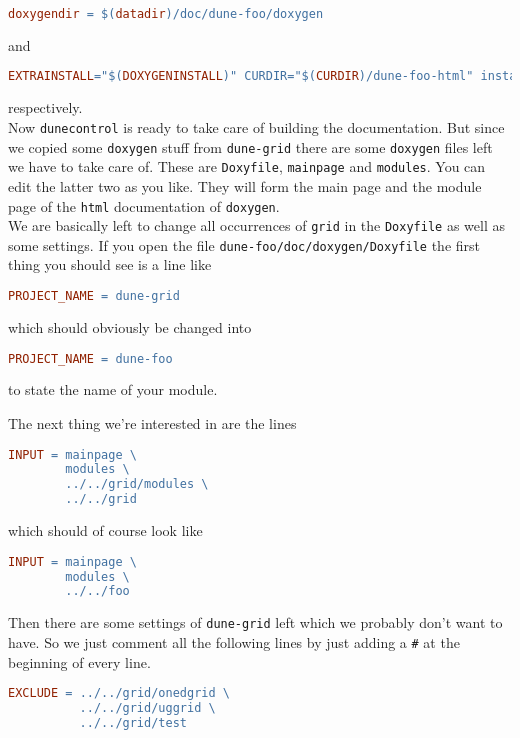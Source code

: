 \documentclass[11pt,a4paper,headinclude,footinclude,DIV16,normalheadings]{scrartcl}
\newcommand{\dunegrid}{\texttt{dune-grid}\xspace}
\newcommand{\dunecontrol}{\texttt{dunecontrol}\xspace}
\begin{document}
\begin{lstlisting}[language=make]
doxygendir = $(datadir)/doc/dune-foo/doxygen
\end{lstlisting}
and

\begin{lstlisting}[language=make]
EXTRAINSTALL="$(DOXYGENINSTALL)" CURDIR="$(CURDIR)/dune-foo-html" install ; \
\end{lstlisting}
respectively.\\
Now \dunecontrol is ready to take care of building the documentation. But since
we copied some \texttt{doxygen} stuff from \dunegrid there are some
\texttt{doxygen} files left we have to take care of. These are
\texttt{Doxyfile}, \texttt{mainpage} and \texttt{modules}. You can edit the
latter two as you like. They will form the main page and the module page of the
\texttt{html} documentation of \texttt{doxygen}.\\
We are basically left to change all occurrences of \texttt{grid} in the
\texttt{Doxyfile} as well as some settings. If you open the file 
\texttt{dune-foo/doc/doxygen/Doxyfile} the first thing you should see is a line
like

\begin{lstlisting}[language=make]
PROJECT_NAME = dune-grid
\end{lstlisting}
which should obviously be changed into

\begin{lstlisting}[language=make]
PROJECT_NAME = dune-foo
\end{lstlisting}
to state the name of your module.

The next thing we're interested in are the lines

\begin{lstlisting}[language=make]
INPUT = mainpage \
        modules \
        ../../grid/modules \
        ../../grid
\end{lstlisting}
which should of course look like

\begin{lstlisting}[language=make]
INPUT = mainpage \
        modules \
        ../../foo
\end{lstlisting}

Then there are some settings of \dunegrid left which we probably don't want to
have. So we just comment all the following lines by just adding a \texttt{\#}
at the beginning of every line.

\begin{lstlisting}[language=make]
EXCLUDE = ../../grid/onedgrid \
          ../../grid/uggrid \
          ../../grid/test
\end{lstlisting}
\end{document}
